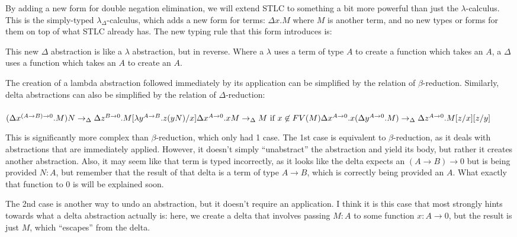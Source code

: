\documentclass[12pt]{article}
\begin{document}
By adding a new form for double negation elimination, we will extend STLC to something a bit more powerful than just the $\lambda$-calculus. This is the simply-typed $\lambda_\Delta$-calculus, which adds a new form for terms: $\Delta x. M$ where $M$ is another term, and no new types or forms for them on top of what STLC already has. The new typing rule that this form introduces is:

\begin{prooftree}
\end{prooftree}

This new $\Delta$ abstraction is like a $\lambda$ abstraction, but in reverse. Where a $\lambda$ uses a term of type $A$ to create a function which takes an $A$, a $\Delta$ uses a function which takes an $A$ to create an $A$.

The creation of a lambda abstraction followed immediately by its application can be simplified by the relation of $\beta$-reduction. Similarly, delta abstractions can also be simplified by the relation of $\Delta$-reduction: \\
\\
$(\Delta x^{(A \to B) \to 0}.M)N \to_\Delta \Delta z^{B \to 0}.M[\lambda y^{A \to B}.z(y N)/x] \\
\Delta x^{A \to 0}.x M \to_\Delta M \text{ if } x \not\in FV(M) \\
\Delta x^{A \to 0}.x(\Delta y^{A \to 0}.M) \to_\Delta \Delta z^{A \to 0}.M[z/x][z/y] \\$

This is significantly more complex than $\beta$-reduction, which only had 1 case. The 1st case is equivalent to $\beta$-reduction, as it deals with abstractions that are immediately applied. However, it doesn't simply ``unabstract'' the abstraction and yield its body, but rather it creates another abstraction. Also, it may seem like that term is typed incorrectly, as it looks like the delta expects an $(A \to B) \to 0$ but is being provided $N: A$, but remember that the result of that delta is a term of type $A \to B$, which is correctly being provided an $A$. What exactly that function to 0 is will be explained soon.

The 2nd case is another way to undo an abstraction, but it doesn't require an application. I think it is this case that most strongly hints towards what a delta abstraction actually is: here, we create a delta that involves passing $M: A$ to some function $x: A \to 0$, but the result is just $M$, which ``escapes'' from the delta. %
\end{document}
